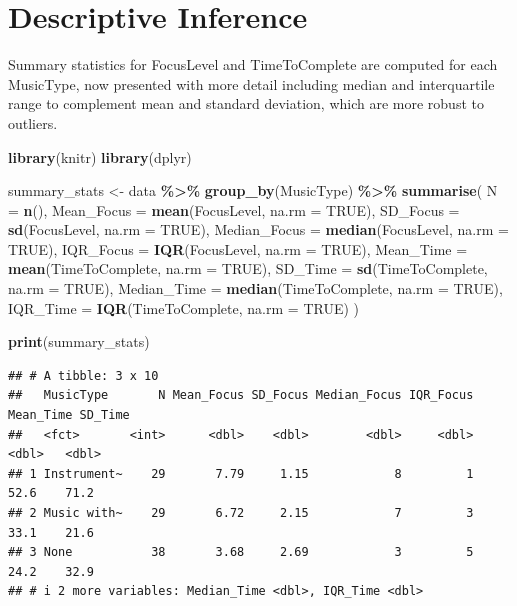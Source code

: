 \documentclass[
]{article}
\newenvironment{Shaded}{\begin{snugshade}}{\end{snugshade}}
\newcommand{\AttributeTok}[1]{\textcolor[rgb]{0.13,0.29,0.53}{#1}}
\newcommand{\ConstantTok}[1]{\textcolor[rgb]{0.56,0.35,0.01}{#1}}
\newcommand{\FunctionTok}[1]{\textcolor[rgb]{0.13,0.29,0.53}{\textbf{#1}}}
\newcommand{\NormalTok}[1]{#1}
\newcommand{\OtherTok}[1]{\textcolor[rgb]{0.56,0.35,0.01}{#1}}
\newcommand{\SpecialCharTok}[1]{\textcolor[rgb]{0.81,0.36,0.00}{\textbf{#1}}}
\begin{document}
\section{Descriptive Inference}\label{descriptive-inference}

Summary statistics for FocusLevel and TimeToComplete are computed for
each MusicType, now presented with more detail including median and
interquartile range to complement mean and standard deviation, which are
more robust to outliers.

\begin{Shaded}
\begin{Highlighting}[]
\FunctionTok{library}\NormalTok{(knitr)}
\FunctionTok{library}\NormalTok{(dplyr)}

\NormalTok{summary\_stats }\OtherTok{\textless{}{-}}\NormalTok{ data }\SpecialCharTok{\%\textgreater{}\%}
  \FunctionTok{group\_by}\NormalTok{(MusicType) }\SpecialCharTok{\%\textgreater{}\%}
  \FunctionTok{summarise}\NormalTok{(}
    \AttributeTok{N =} \FunctionTok{n}\NormalTok{(),}
    \AttributeTok{Mean\_Focus =} \FunctionTok{mean}\NormalTok{(FocusLevel, }\AttributeTok{na.rm =} \ConstantTok{TRUE}\NormalTok{),}
    \AttributeTok{SD\_Focus =} \FunctionTok{sd}\NormalTok{(FocusLevel, }\AttributeTok{na.rm =} \ConstantTok{TRUE}\NormalTok{),}
    \AttributeTok{Median\_Focus =} \FunctionTok{median}\NormalTok{(FocusLevel, }\AttributeTok{na.rm =} \ConstantTok{TRUE}\NormalTok{),}
    \AttributeTok{IQR\_Focus =} \FunctionTok{IQR}\NormalTok{(FocusLevel, }\AttributeTok{na.rm =} \ConstantTok{TRUE}\NormalTok{),}
    \AttributeTok{Mean\_Time =} \FunctionTok{mean}\NormalTok{(TimeToComplete, }\AttributeTok{na.rm =} \ConstantTok{TRUE}\NormalTok{),}
    \AttributeTok{SD\_Time =} \FunctionTok{sd}\NormalTok{(TimeToComplete, }\AttributeTok{na.rm =} \ConstantTok{TRUE}\NormalTok{),}
    \AttributeTok{Median\_Time =} \FunctionTok{median}\NormalTok{(TimeToComplete, }\AttributeTok{na.rm =} \ConstantTok{TRUE}\NormalTok{),}
    \AttributeTok{IQR\_Time =} \FunctionTok{IQR}\NormalTok{(TimeToComplete, }\AttributeTok{na.rm =} \ConstantTok{TRUE}\NormalTok{)}
\NormalTok{  )}

\FunctionTok{print}\NormalTok{(summary\_stats)}
\end{Highlighting}
\end{Shaded}

\begin{verbatim}
## # A tibble: 3 x 10
##   MusicType       N Mean_Focus SD_Focus Median_Focus IQR_Focus Mean_Time SD_Time
##   <fct>       <int>      <dbl>    <dbl>        <dbl>     <dbl>     <dbl>   <dbl>
## 1 Instrument~    29       7.79     1.15            8         1      52.6    71.2
## 2 Music with~    29       6.72     2.15            7         3      33.1    21.6
## 3 None           38       3.68     2.69            3         5      24.2    32.9
## # i 2 more variables: Median_Time <dbl>, IQR_Time <dbl>
\end{verbatim}
\end{document}
